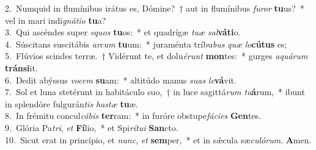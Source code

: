 {2.~}Numquid in flumínibus irátus es, Dómine?~† aut in flumínibus \textit{fu}\textit{ror} \textbf{tu}us?~* vel in mari indi\textit{gná}\textit{ti}\textit{o} \textbf{tu}a?\\
{3.~}Qui ascéndes super \textit{e}\textit{quos} \textbf{tu}os:~* et quadrígæ \textit{tu}\textit{æ} \textit{sal}\textbf{vá}\textbf{ti}o.\\
{4.~}Súscitans suscitábis \textit{ar}\textit{cum} \textbf{tu}um:~* juraménta tríbu\textit{bus} \textit{quæ} \textit{lo}\textbf{cú}\textbf{tus} es;\\
{5.~}Flúvios scindes terræ.~† Vidérunt te, et dolu\textit{é}\textit{runt} \textbf{mon}tes:~* gurges \textit{a}\textit{quá}\textit{rum} \textbf{trán}\textbf{si}it.\\
{6.~}Dedit abýssus \textit{vo}\textit{cem} \textbf{su}am:~* altitúdo manus \textit{su}\textit{as} \textit{le}\textbf{vá}vit.\\
{7.~}Sol et luna stetérunt in habitáculo suo,~† in luce sagittá\textit{rum} \textit{tu}\textbf{á}rum,~* ibunt in splendóre fulgurán\textit{tis} \textit{ha}\textit{stæ} \textbf{tu}æ.\\
{8.~}In frémitu concul\textit{cá}\textit{bis} \textbf{ter}ram:~* in furóre obstupe\textit{fá}\textit{ci}\textit{es} \textbf{Gen}tes.\\
{9.~}Glória Pa\textit{tri}, \textit{et} \textbf{Fí}lio,~* et Spi\textit{rí}\textit{tu}\textit{i} \textbf{San}cto.\\
{10.~}Sicut erat in princípio, et \textit{nunc}, \textit{et} \textbf{sem}per,~* et in sǽcula sæ\textit{cu}\textit{ló}\textit{rum}. \textbf{A}men.\\
